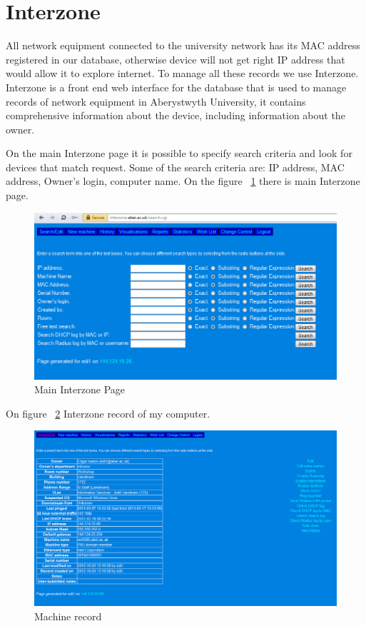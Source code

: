 \documentclass[10pt,a4paper,headinclude=true]{report}
\begin{document}
\section{Interzone}
All network equipment connected to the university network has its MAC address registered in our database, otherwise device will not get right IP address that would allow it to explore internet. To manage all these records we use Interzone. 
Interzone is a front end web interface for the database that is used to manage records of network equipment in Aberystwyth University, it contains comprehensive information about the device, including information about the owner. 

On the main Interzone page it is possible to specify search criteria and look for devices that match request. Some of the search criteria are: IP address, MAC address, Owner's login, computer name. On the figure ~\ref{fig:main_interzone_page} there is main Interzone page.

\begin{figure}[H]
\centering
\centerline{\includegraphics[scale=0.5]{./main_interzone_page}}
\caption{Main Interzone Page}
\label{fig:main_interzone_page}
\end{figure}

On figure ~\ref{fig:machine_record} Interzone record of my computer.

\begin{figure}[H]
\centering
\centerline{\includegraphics[scale=0.5]{./machine_record}}
\caption{Machine record}
\label{fig:machine_record}
\end{figure}
\end{document}
